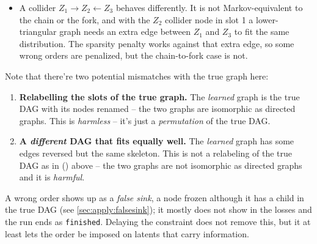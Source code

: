 \begin{itemize}[leftmargin=1.5em]
{\begin{itemize}
isomorphic to it: the chain has a path of length two, while the fork has a node with
two children, so no renaming of nodes turns one into the other. 
\item A collider
$Z_1\to Z_2\leftarrow Z_3$ behaves differently. It is not Markov-equivalent to the
chain or the fork, and with the $Z_2$ collider node in slot 1 a lower-triangular graph
needs an extra edge between $Z_1$ and $Z_3$ to fit the same distribution. The
sparsity penalty works against that extra edge, so some wrong orders are penalized,
but the chain-to-fork case is not.
\end{itemize}
}%
      Note that there're two potential mismatches with the true graph here:
      \begin{enumerate}
	  \item \label{item:perm} \textbf{Relabelling the slots of the true graph.} The \emph{learned} 
	     graph is the true DAG with its nodes renamed -- the two graphs are isomorphic as directed 
	     graphs. This is \emph{harmless} -- it's just a \emph{permutation} of the true DAG.
      \item \textbf{A \emph{different} DAG that fits equally well.} The \emph{learned} graph has 
         some edges reversed but the same skeleton. This is not a relabeling of the true DAG as in
         () above -- the two graphs are not isomorphic as directed graphs and 
         it is \emph{harmful}.
      \end{enumerate}       
      A wrong order shows up as a \emph{false sink}, a node frozen although it has a
      child in the true DAG (see \cref{sec:apply:falsesink}); it mostly does not show in the losses
      and the run ends as \texttt{finished}. Delaying the constraint does not remove
      this, but it at least lets the order be imposed on latents that carry
      information.
\end{itemize}


